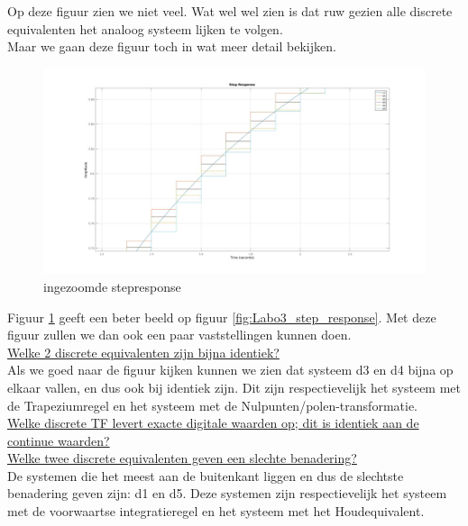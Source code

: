 \documentclass[a4paper, 12pt]{article}
\begin{document}
Op deze figuur zien we niet veel. Wat wel wel zien is dat ruw gezien alle discrete equivalenten het analoog systeem lijken te volgen.\\
Maar we gaan deze figuur toch in wat meer detail bekijken.

\begin{figure}[H]
	\includegraphics[width=1\linewidth]{Labo3_step_response2.jpg}
	\caption{ingezoomde stepresponse}
	\label{fig:Labo3_step_response_zoom}
\end{figure}

Figuur \ref{fig:Labo3_step_response_zoom} geeft een beter beeld op figuur \ref{fig:Labo3_step_response}. Met deze figuur zullen we dan ook een paar vaststellingen kunnen doen. \\

\underline{Welke 2 discrete equivalenten zijn bijna identiek?}\\
Als we goed naar de figuur kijken kunnen we zien dat systeem d3 en d4 bijna op elkaar vallen, en dus ook bij identiek zijn. Dit zijn respectievelijk het systeem met de Trapeziumregel en het systeem met de Nulpunten/polen-transformatie.\\

\underline{Welke discrete TF levert exacte digitale waarden op; dit is identiek aan de continue waarden?}\\

\underline{Welke twee discrete equivalenten geven een slechte benadering?}\\
De systemen die het meest aan de buitenkant liggen en dus de slechtste benadering geven zijn: d1 en d5. Deze systemen zijn respectievelijk het systeem met de voorwaartse integratieregel en het systeem met het Houdequivalent.
\end{document}
